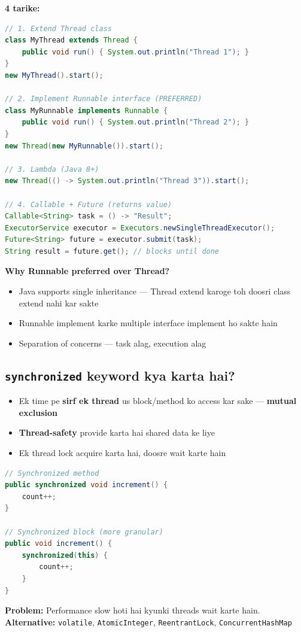 \documentclass[12pt,a4paper]{article}
\begin{document}
\begin{answerbox}
\textbf{4 tarike:}
\begin{lstlisting}[language=Java]
// 1. Extend Thread class
class MyThread extends Thread {
    public void run() { System.out.println("Thread 1"); }
}
new MyThread().start();

// 2. Implement Runnable interface (PREFERRED)
class MyRunnable implements Runnable {
    public void run() { System.out.println("Thread 2"); }
}
new Thread(new MyRunnable()).start();

// 3. Lambda (Java 8+)
new Thread(() -> System.out.println("Thread 3")).start();

// 4. Callable + Future (returns value)
Callable<String> task = () -> "Result";
ExecutorService executor = Executors.newSingleThreadExecutor();
Future<String> future = executor.submit(task);
String result = future.get(); // blocks until done
\end{lstlisting}
\textbf{Why Runnable preferred over Thread?}
\begin{itemize}
    \item Java supports single inheritance --- Thread extend karoge toh doosri class extend nahi kar sakte
    \item Runnable implement karke multiple interface implement ho sakte hain
    \item Separation of concerns --- task alag, execution alag
\end{itemize}
\end{answerbox}

\subsection{\texttt{synchronized} keyword kya karta hai?}

\begin{answerbox}
\begin{itemize}
    \item Ek time pe \textbf{sirf ek thread} us block/method ko access kar sake --- \textbf{mutual exclusion}
    \item \textbf{Thread-safety} provide karta hai shared data ke liye
    \item Ek thread lock acquire karta hai, doosre wait karte hain
\end{itemize}
\begin{lstlisting}[language=Java]
// Synchronized method
public synchronized void increment() {
    count++;
}

// Synchronized block (more granular)
public void increment() {
    synchronized(this) {
        count++;
    }
}
\end{lstlisting}
\textbf{Problem:} Performance slow hoti hai kyunki threads wait karte hain.\\
\textbf{Alternative:} \texttt{volatile}, \texttt{AtomicInteger}, \texttt{ReentrantLock}, \texttt{ConcurrentHashMap}
\end{answerbox}
\end{document}
